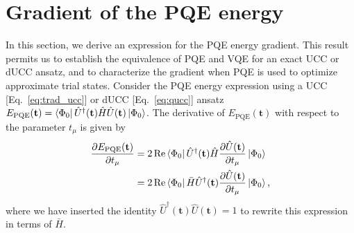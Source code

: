\documentclass[aps,prx, reprint]{revtex4-2}
\begin{document}
\appendix


\section{Gradient of the PQE energy}
\label{sec:appD}

In this section, we derive an expression for the PQE energy gradient. This result permits us to establish the equivalence of PQE and VQE for an exact UCC or dUCC ansatz, and to characterize the gradient when PQE is used to optimize approximate trial states.
Consider the PQE energy expression using a UCC [Eq.~\eqref{eq:trad_ucc}] or dUCC [Eq.~\eqref{eq:qucc}] ansatz
$E_\mathrm{PQE}(\mathbf{t}) = \bra{\Phi_0} \hat{U}^\dagger(\mathbf{t}) \hat{H} \hat{U}(\mathbf{t}) \ket{\Phi_0}$.
The derivative of $E_\mathrm{PQE}(\mathbf{t})$ with respect to the parameter $t_\mu$ is given by
\begin{equation}
\label{eq:appA:1}
\begin{split}
\frac{\partial E_\mathrm{PQE}(\mathbf{t})}{\partial t_\mu} & =
2 \, \mathrm{Re} \bra{\Phi_0}  \hat{U}^\dagger(\mathbf{t}) \hat{H} \frac{\partial \hat{U}(\mathbf{t})}{\partial t_\mu}  \ket{\Phi_0} \\
& = 2 \, \mathrm{Re} \bra{\Phi_0} \bar{H} \hat{U}^\dagger(\mathbf{t}) \frac{\partial \hat{U}(\mathbf{t})}{\partial t_\mu}  \ket{\Phi_0},
\end{split}
\end{equation}
where we have inserted the identity $\hat{U}^\dagger(\mathbf{t})  \hat{U}(\mathbf{t}) = 1$ to rewrite this expression in terms of $\bar{H}$.
\end{document}
